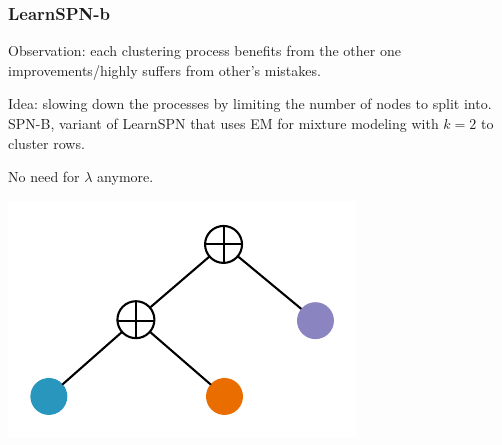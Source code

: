 \documentclass[xcolor={usenames,dvipsnames,svgnames}, compress]{beamer}
\begin{document}
\begin{frame}
  \frametitle{LearnSPN-b}
  Observation: each clustering process benefits from the other one improvements/highly suffers
  from other's mistakes.\par\bigskip

  Idea: slowing down the processes by limiting the number of
  nodes to split into. \textsf{SPN-B}, variant of \textsf{LearnSPN} that uses EM
  for mixture modeling with
  $k=2$ to cluster rows.

  No need for $\lambda$ anymore.\par\bigskip

  \hspace{-5pt}\begin{minipage}[t]{0.3\linewidth}
    \begin{center}
      \includegraphics[width=0.9\linewidth]{figures/learnspn-4.pdf}
    \end{center}
  \end{minipage}
\end{frame}
\end{document}
